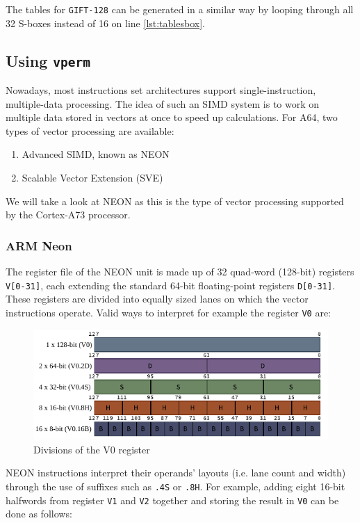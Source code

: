 The tables for \texttt{GIFT-128} can be generated in a similar way by looping
through all 32 S-boxes instead of 16 on line \ref{lst:tablesbox}.

\subsection{Using \texttt{vperm}}

Nowadays, most instructions set architectures support single-instruction,
multiple-data processing. The idea of such an SIMD system is to work on
multiple data stored in vectors at once to speed up calculations. For A64, two
types of vector processing are available:

\begin{enumerate}
    \item Advanced SIMD, known as NEON
    \item Scalable Vector Extension (SVE)
\end{enumerate}

We will take a look at NEON as this is the type of vector processing supported
by the Cortex-A73 processor.

\subsubsection{ARM Neon}

The register file of the NEON unit is made up of 32 quad-word (128-bit)
registers \texttt{V[0-31]}, each extending the standard 64-bit floating-point
registers \mbox{\texttt{D[0-31]}}. These registers are divided into equally
sized lanes on which the vector instructions operate. Valid ways to interpret
for example the register \texttt{V0} are:

\begin{figure}[h!]
    \centering
    \includegraphics[width=\textwidth]{Figures/V_register.pdf}
    \caption{Divisions of the V0 register}
\end{figure}

NEON instructions interpret their operands' layouts (i.e. lane count and width)
through the use of suffixes such as \texttt{.4S} or \texttt{.8H}. For example,
adding eight 16-bit halfwords from register \texttt{V1} and \texttt{V2}
together and storing the result in \texttt{V0} can be done as follows:

